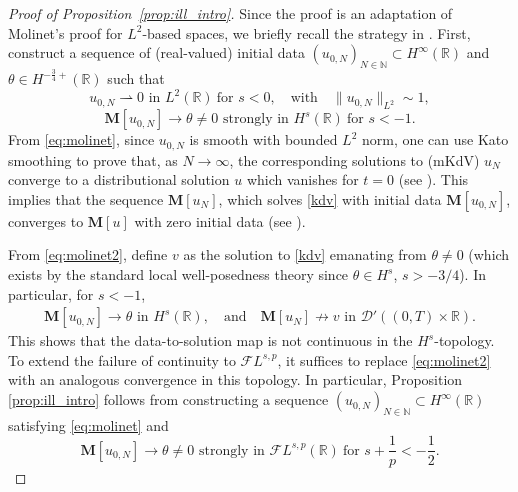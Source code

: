 \documentclass[%
11pt,  reqno]{amsart}
\newcommand{\5}{\textup{V}}
\newcommand{\FL}{\mathcal{F} L}
\theoremstyle{remark}
\newcommand{\R}{\mathbb{R}}
\newcommand{\MMb}{\mathbf{M}}
\newcommand{\N}{\mathbb{N}}
\numberwithin{equation}{section}
\numberwithin{theorem}{section}
\begin{document}
\begin{proof}[Proof of Proposition~\ref{prop:ill_intro}]


Since the proof is an adaptation of Molinet's proof for $L^2$-based spaces, we briefly recall the strategy in \cite{Molinet_ill_line}. 
 First, construct a sequence of (real-valued) initial data $(u_{0,N})_{N\in\N}\subset H^\infty(\R)$ and $\theta\in H^{-\frac34+}(\R)$ such that
\begin{equation}\label{eq:molinet}
	u_{0,N}\rightharpoonup 0 \mbox{ in }L^2(\R)\ \text{for } s<0,\quad \text{with} 
    \quad \|u_{0,N}\|_{L^2}\sim 1,
\end{equation}
\begin{equation}\label{eq:molinet2}
 \MMb[u_{0,N}] \to \theta\neq 0  \mbox{ strongly in }H^{s}(\R)
 \ \text{for }
 s<-1.
\end{equation}
From \eqref{eq:molinet}, since $u_{0,N}$ is smooth with bounded $L^2$ norm, one can use Kato smoothing to prove that, as $N\to \infty$, the corresponding solutions to (mKdV) $u_N$ converge to a distributional solution $u$ which vanishes for $t=0$ (see \cite[Proposition 2.1]{Molinet_ill_line}). This implies that the sequence $\MMb[u_N]$, which solves \eqref{kdv} with initial data $\MMb[u_{0,N}]$, converges to $\MMb[u]$ with zero initial data (see \cite[Proposition 2.2]{Molinet_ill_line}). 

From \eqref{eq:molinet2}, define $v$ as the solution to \eqref{kdv} emanating from $\theta\neq 0$ (which exists by the standard local well-posedness theory since $\theta\in H^s$, $s>-3/4$). 
In particular, for $s<-1$,
\begin{align}
\MMb[u_{0, N}] \to \theta \mbox{ in }H^s(\R), 
\quad
\text{and}
\quad
\MMb[u_N] \not\to v \mbox{ in  }\mathcal{D}'((0,T)\times \R).
\end{align}
This shows that the data-to-solution map is not continuous in the $H^s$-topology.
To extend the failure of continuity to $\FL^{s,p}$, it suffices to replace \eqref{eq:molinet2} with an analogous convergence in this topology.
In particular, Proposition \ref{prop:ill_intro} follows from constructing a sequence $(u_{0,N})_{N\in \N} \subset H^\infty(\R)$ satisfying \eqref{eq:molinet} and 
\begin{equation}\label{eq:molinet2_v2}
 \MMb[u_{0,N}] \to \theta\neq 0 \mbox{ strongly in }\mathcal{F}L^{s,p}(\R) \ \text{for } s+\frac1p<-\frac12.
\end{equation}





\end{proof}
\end{document}
